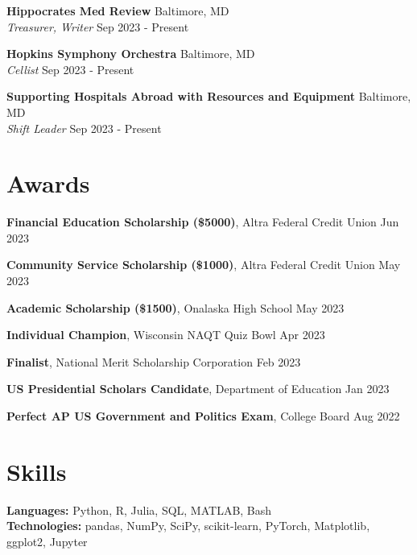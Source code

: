 \documentclass[11pt]{article}       %
\begin{document}
\textbf{Hippocrates Med Review} \hfill Baltimore, MD \\
\textit{Treasurer, Writer} \hfill Sep 2023 - Present \\

\vspace{5pt}

\textbf{Hopkins Symphony Orchestra} \hfill Baltimore, MD \\
\textit{Cellist} \hfill Sep 2023 - Present \\

\vspace{5pt}

\textbf{Supporting Hospitals Abroad with Resources and Equipment} \hfill Baltimore, MD \\
\textit{Shift Leader} \hfill Sep 2023 - Present \\

\vspace{-9pt}

\section*{Awards}
\textbf{Financial Education Scholarship (\$5000)}, Altra Federal Credit Union \hfill Jun 2023 \\

\vspace{5pt}

\textbf{Community Service Scholarship (\$1000)}, Altra Federal Credit Union \hfill May 2023 \\

\vspace{5pt}

\textbf{Academic Scholarship (\$1500)}, Onalaska High School \hfill May 2023 \\

\vspace{5pt}

\textbf{Individual Champion}, Wisconsin NAQT Quiz Bowl \hfill Apr 2023 \\

\vspace{5pt}

\textbf{Finalist}, National Merit Scholarship Corporation \hfill Feb 2023 \\

\vspace{5pt}

\textbf{US Presidential Scholars Candidate}, Department of Education \hfill Jan 2023 \\

\vspace{5pt}

\textbf{Perfect AP US Government and Politics Exam}, College Board \hfill Aug 2022

\vspace{-9pt}

\section*{Skills}
\textbf{Languages:} Python, R, Julia, SQL, MATLAB, Bash \\
\textbf{Technologies:} pandas, NumPy, SciPy, scikit-learn, PyTorch, Matplotlib, ggplot2, Jupyter
\end{document}
